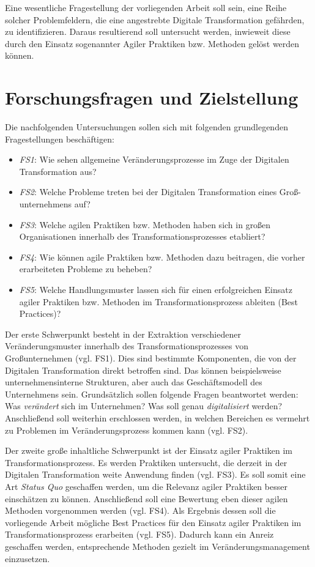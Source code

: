 Eine wesentliche Fragestellung der vorliegenden Arbeit soll sein, eine Reihe solcher Problemfeldern, die eine angestrebte Digitale Transformation gefährden, zu identifizieren. Daraus resultierend soll untersucht werden, inwieweit diese durch den Einsatz sogenannter Agiler Praktiken bzw. Methoden gelöst werden können.

\section{Forschungsfragen und Zielstellung}
\label{introduction:fs}

Die nachfolgenden Untersuchungen sollen sich mit folgenden grundlegenden
Fragestellungen beschäftigen:

\begin{itemize}[noitemsep, topsep=0pt]
	\item \textit{FS1}: Wie sehen allgemeine Veränderungsprozesse im Zuge der Digitalen Transformation aus?
	\item \textit{FS2}: Welche Probleme treten bei der Digitalen Transformation eines Groß-unternehmens auf?
	\item \textit{FS3}: Welche agilen Praktiken bzw. Methoden haben sich in großen Organisationen innerhalb des Transformationsprozesses etabliert?
	\item \textit{FS4}: Wie können agile Praktiken bzw. Methoden dazu beitragen, die vorher erarbeiteten Probleme zu beheben?
	\item \textit{FS5}: Welche Handlungsmuster lassen sich für einen erfolgreichen Einsatz agiler Praktiken bzw. Methoden im Transformationsprozess ableiten (Best Practices)?
\end{itemize}
Der erste Schwerpunkt besteht in der Extraktion verschiedener Veränderungsmuster innerhalb des Transformationsprozesses von Großunternehmen (vgl. FS1). Dies sind bestimmte Komponenten, die von der Digitalen Transformation direkt betroffen sind. Das können beispielsweise unternehmensinterne Strukturen, aber auch das Geschäftsmodell des Unternehmens sein. Grundsätzlich sollen folgende Fragen beantwortet werden: Was \textit{verändert} sich im Unternehmen? Was soll genau \textit{digitalisiert} werden? Anschließend soll weiterhin erschlossen werden,  in welchen Bereichen es vermehrt zu Problemen im Veränderungsprozess kommen kann (vgl. FS2).

Der zweite große inhaltliche Schwerpunkt ist der Einsatz agiler Praktiken im Transformationsprozess. Es werden Praktiken untersucht, die derzeit in der Digitalen Transformation weite Anwendung finden (vgl. FS3). Es soll somit eine Art \textit{Status Quo} geschaffen werden, um die Relevanz agiler Praktiken besser einschätzen zu können. Anschließend soll eine Bewertung eben dieser agilen Methoden vorgenommen werden (vgl. FS4). Als Ergebnis dessen soll die vorliegende Arbeit mögliche Best Practices für den Einsatz agiler Praktiken im Transformationsprozess erarbeiten (vgl. FS5). Dadurch kann ein Anreiz geschaffen werden, entsprechende Methoden gezielt im Veränderungsmanagement einzusetzen. 

